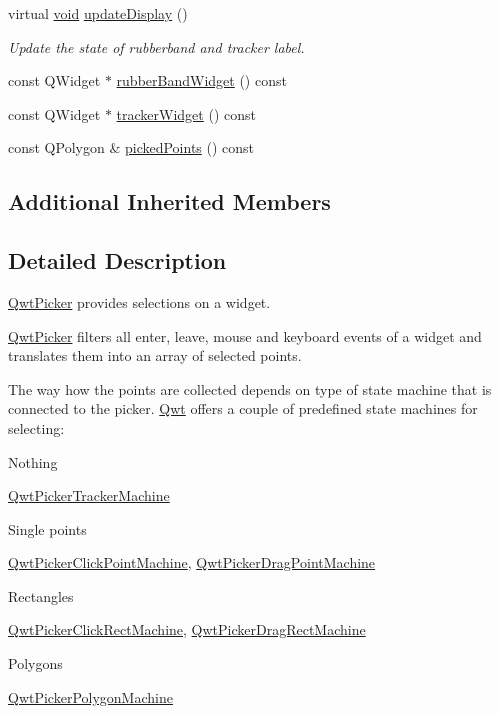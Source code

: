 \begin{DoxyCompactItemize}
\item 
virtual \hyperlink{group___u_a_v_objects_plugin_ga444cf2ff3f0ecbe028adce838d373f5c}{void} \hyperlink{class_qwt_picker_a03aa9bf28f991473d564a57d1bf3bdcc}{update\-Display} ()
\begin{DoxyCompactList}\small\item\em Update the state of rubberband and tracker label. \end{DoxyCompactList}\item 
const Q\-Widget $\ast$ \hyperlink{class_qwt_picker_aa13f79148c53b9aec63f14b62ccc98cb}{rubber\-Band\-Widget} () const 
\item 
const Q\-Widget $\ast$ \hyperlink{class_qwt_picker_a5eb014068d91e1b26a937fc90b035efc}{tracker\-Widget} () const 
\item 
const Q\-Polygon \& \hyperlink{class_qwt_picker_a9e10695cd170fe335c6959de8d1298a1}{picked\-Points} () const 
\end{DoxyCompactItemize}
\subsection*{Additional Inherited Members}


\subsection{Detailed Description}
\hyperlink{class_qwt_picker}{Qwt\-Picker} provides selections on a widget. 

\hyperlink{class_qwt_picker}{Qwt\-Picker} filters all enter, leave, mouse and keyboard events of a widget and translates them into an array of selected points.

The way how the points are collected depends on type of state machine that is connected to the picker. \hyperlink{namespace_qwt}{Qwt} offers a couple of predefined state machines for selecting\-:


\begin{DoxyItemize}
\item Nothing\par
 \hyperlink{class_qwt_picker_tracker_machine}{Qwt\-Picker\-Tracker\-Machine}
\item Single points\par
 \hyperlink{class_qwt_picker_click_point_machine}{Qwt\-Picker\-Click\-Point\-Machine}, \hyperlink{class_qwt_picker_drag_point_machine}{Qwt\-Picker\-Drag\-Point\-Machine}
\item Rectangles\par
 \hyperlink{class_qwt_picker_click_rect_machine}{Qwt\-Picker\-Click\-Rect\-Machine}, \hyperlink{class_qwt_picker_drag_rect_machine}{Qwt\-Picker\-Drag\-Rect\-Machine}
\item Polygons\par
 \hyperlink{class_qwt_picker_polygon_machine}{Qwt\-Picker\-Polygon\-Machine}
\end{DoxyItemize}

